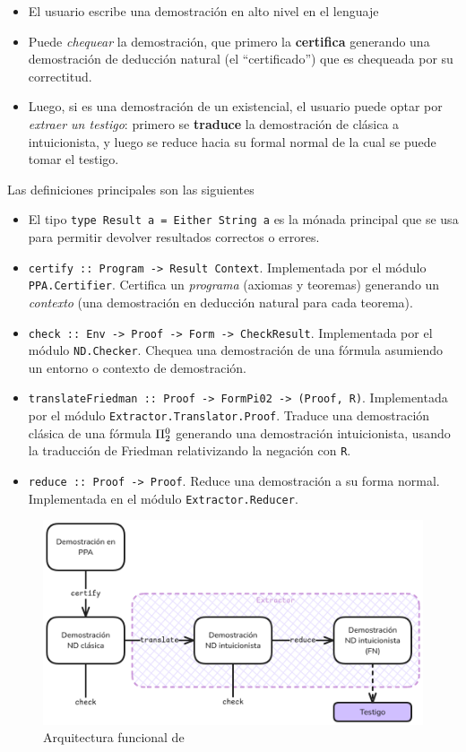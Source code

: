 \begin{itemize}
    \item El usuario escribe una demostración en alto nivel en el lenguaje \ppaLang{}
    \item Puede \textit{chequear} la demostración, que primero la \textbf{certifica} generando una demostración de deducción natural (el ``certificado'') que es chequeada por su correctitud.
    \item Luego, si es una demostración de un existencial, el usuario puede optar por \textit{extraer un testigo}: primero se \textbf{traduce} la demostración de clásica a intuicionista, y luego se reduce hacia su formal normal de la cual se puede tomar el testigo.
\end{itemize}

Las definiciones principales son las siguientes

\begin{itemize}
    \item El tipo \texttt{type Result a = Either String a} es la mónada principal que se usa para permitir devolver resultados correctos o errores.
    \item \texttt{certify :: Program -> Result Context}. Implementada por el módulo \texttt{PPA.Certifier}. Certifica un \textit{programa} (axiomas y teoremas) generando un \textit{contexto} (una demostración en deducción natural para cada teorema).
    \item \texttt{check :: Env -> Proof -> Form -> CheckResult}.
    Implementada por el módulo \texttt{ND.Checker}. Chequea una demostración de una fórmula asumiendo un entorno o contexto de demostración.
    \item \texttt{translateFriedman :: Proof -> FormPi02 -> (Proof, R)}. Implementada por el módulo \texttt{Extractor.Translator.Proof}. Traduce una demostración clásica de una fórmula $\Pi^0_{2}$ generando una demostración intuicionista, usando la traducción de Friedman relativizando la negación con \texttt{R}.
    \item \texttt{reduce :: Proof -> Proof}. Reduce una demostración a su forma normal. Implementada en el módulo \texttt{Extractor.Reducer}.
\end{itemize}

\begin{figure}[h]
    \includegraphics[scale=0.42]{img/arch.png}
    \centering
    \caption{Arquitectura funcional de \ppaTool{}}
    \label{intro:fig:ppa-arch}
\end{figure}

